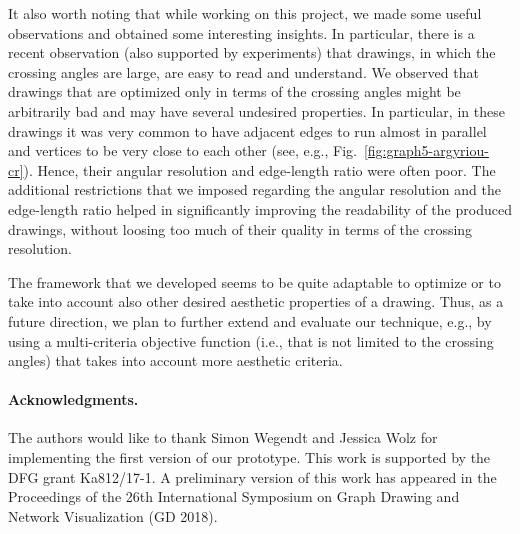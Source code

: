\documentclass{comjnl}
\begin{document}
It also worth noting that while working on this project, we made some useful observations and obtained some interesting insights. In particular, there is a recent observation (also supported by experiments) that drawings, in which the crossing angles are large, are easy to read and understand. We observed that drawings that are optimized only in terms of the crossing angles might be arbitrarily bad and may have several undesired properties. In particular, in these drawings it was very common to have adjacent edges to run almost in parallel and vertices to be very close to each other (see, e.g., Fig.~\ref{fig:graph5-argyriou-cr}). Hence, their angular resolution and edge-length ratio were often poor. The additional restrictions that we imposed regarding the angular resolution and the edge-length ratio helped in significantly improving the readability of the produced drawings, without loosing too much of their quality in terms of the crossing resolution.


The framework that we developed seems to be quite adaptable to optimize or to take into account also other desired aesthetic properties of a drawing. Thus, as a future direction, we plan to further extend and evaluate our technique, e.g., by using a multi-criteria objective function (i.e., that is not limited to the crossing angles) that takes into account more aesthetic criteria. 

\paragraph{Acknowledgments.} The authors would like to thank Simon Wegendt and Jessica Wolz for implementing the first version of our prototype. This work is supported by the DFG grant Ka812/17-1. A preliminary version of this work has appeared in the Proceedings of the 26th International Symposium on Graph Drawing and Network Visualization (GD 2018).




\clearpage
\end{document}
